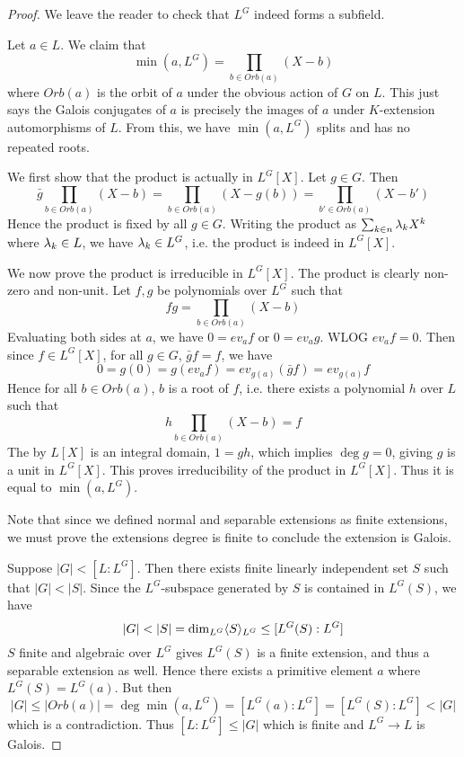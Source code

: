 \documentclass[../book.tex]{subfiles}
\begin{document}
\begin{proof}
    We leave the reader to check that $L^G$ indeed forms a subfield. 

    Let $a \in L$. We claim that \[
            \min(a,L^G) = \prod_{b \in Orb(a)} (X - b)
        \]
        where $Orb(a)$ is the orbit of $a$ under the obvious action of $G$ on $L$. 
        This just says the Galois conjugates of $a$ is precisely
        the images of $a$ under $K$-extension automorphisms of $L$. 
        From this, we have $\min(a,L^G)$ splits and has no repeated roots. 
    
        We first show that the product is actually in $L^G[X]$. 
        Let $g \in G$. Then \[
            \bar{g} \prod_{b \in Orb(a)} (X - b) 
            = \prod_{b \in Orb(a)} (X - g(b)) = \prod_{b' \in Orb(a)} (X - b')
        \]
        Hence the product is fixed by all $g \in G$. 
        Writing the product as $\sum_{k\in n} \lambda_k X^k$ where $\lambda_k \in L$,
        we have $\lambda_k \in L^G$, i.e. the product is indeed in $L^G[X]$. 
    
        We now prove the product is irreducible in $L^G[X]$.
        The product is clearly non-zero and non-unit. 
        Let $f, g$ be polynomials over $L^G$ such that \[
            fg = \prod_{b \in Orb(a)} (X - b)
        \]
        Evaluating both sides at $a$, we have $0 = ev_a f$ or $0 = ev_a g$. 
        WLOG $ev_a f = 0$. 
        Then since $f \in L^G[X]$, for all $g \in G$, $\bar{g}f = f$, 
        we have \[
            0 = g(0) = g(ev_a f) = ev_{g(a)}(\bar{g} f) = ev_{g(a)} f
        \]
        Hence for all $b \in Orb(a)$, $b$ is a root of $f$, i.e.
        there exists a polynomial $h$ over $L$ such that \[
            h \prod_{b \in Orb(a)} (X - b) = f
        \]
        The by $L[X]$ is an integral domain, $1 = gh$,
        which implies $\deg g = 0$, giving $g$ is a unit in $L^G[X]$. 
        This proves irreducibility of the product in $L^G[X]$. 
        Thus it is equal to $\min(a,L^G)$. 
    
        Note that since we defined normal and separable extensions as 
        finite extensions,
        we must prove the extensions degree is finite 
        to conclude the extension is Galois.
    
        Suppose $|G| < [L : L^G]$. 
        Then there exists finite linearly independent set $S$ such that $|G| < |S|$. 
        Since the $L^G$-subspace generated by $S$ is contained in $L^G(S)$, 
        we have \[ 
            |G| < |S| = \dim_{L^G} \langle S\rangle_{L^G} \leq [L^G(S) : L^G] 
        \]
        $S$ finite and algebraic over $L^G$ gives $L^G(S)$ is a finite extension,
        and thus a separable extension as well. 
        Hence there exists a primitive element $a$ where $L^G(S) = L^G(a)$. 
        But then \[
            |G| \leq |Orb(a)| = \deg\min(a,L^G) = [L^G(a) : L^G] 
            = [L^G(S) : L^G] < |G|
        \]
        which is a contradiction. 
        Thus $[L : L^G] \leq |G|$ which is finite
        and $L^G \to L$ is Galois. 
    

\end{proof}
\end{document}
